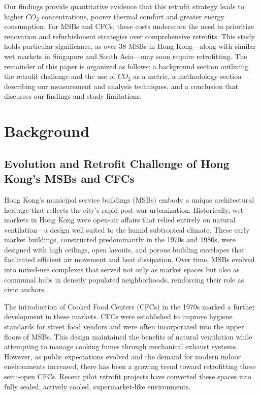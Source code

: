 \documentclass[preprint,12pt]{elsarticle}
\begin{document}
Our findings provide quantitative evidence that this retrofit strategy leads to higher $CO_2$ concentrations\cite{7}, poorer thermal comfort and greater energy consumption\cite{8,9}. For MSBs and CFCs, these costs underscore the need to prioritize renovation and refurbishment strategies over comprehensive retrofits. This study holds particular significance, as over 38 MSBs in Hong Kong—along with similar wet markets in Singapore and South Asia—may soon require retrofitting. The remainder of this paper is organized as follows: a background section outlining the retrofit challenge and the use of $CO_2$ as a metric, a methodology section describing our measurement and analysis techniques, and a conclusion that discusses our findings and study limitations.


\section{Background}
\subsection{Evolution and Retrofit Challenge of Hong Kong’s MSBs and CFCs}    
    Hong Kong’s municipal service buildings (MSBs) embody a unique architectural heritage that reflects the city’s rapid post‐war urbanization. Historically, wet markets in Hong Kong were open‐air affairs that relied entirely on natural ventilation—a design well suited to the humid subtropical climate\cite{1}. These early market buildings, constructed predominantly in the 1970s and 1980s, were designed with high ceilings, open layouts, and porous building envelopes that facilitated efficient air movement and heat dissipation\cite{1,2}. Over time, MSBs evolved into mixed‐use complexes that served not only as market spaces but also as communal hubs in densely populated neighborhoods, reinforcing their role as civic anchors\cite{3}.
    
    The introduction of Cooked Food Centers (CFCs) in the 1970s marked a further development in these markets. CFCs were established to improve hygiene standards for street food vendors and were often incorporated into the upper floors of MSBs. This design maintained the benefits of natural ventilation while attempting to manage cooking fumes through mechanical exhaust systems\cite{2,3}. However, as public expectations evolved and the demand for modern indoor environments increased, there has been a growing trend toward retrofitting these semi‐open CFCs. Recent pilot retrofit projects have converted these spaces into fully sealed, actively cooled, supermarket‐like environments\cite{4}.
\end{document}
